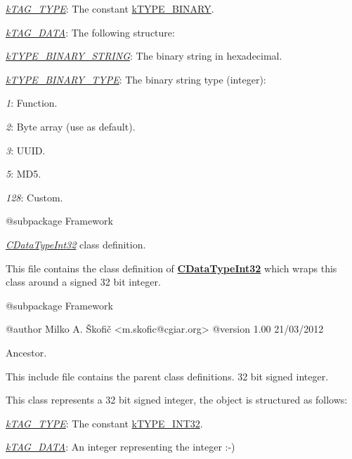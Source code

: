 \begin{DoxyItemize}
\item {\itshape \hyperlink{}{k\-T\-A\-G\-\_\-\-T\-Y\-P\-E}}\-: The constant \hyperlink{}{k\-T\-Y\-P\-E\-\_\-\-B\-I\-N\-A\-R\-Y}. 
\item {\itshape \hyperlink{}{k\-T\-A\-G\-\_\-\-D\-A\-T\-A}}\-: The following structure\-: 
\begin{DoxyItemize}
\item {\itshape \hyperlink{}{k\-T\-Y\-P\-E\-\_\-\-B\-I\-N\-A\-R\-Y\-\_\-\-S\-T\-R\-I\-N\-G}}\-: The binary string in hexadecimal. 
\item {\itshape \hyperlink{}{k\-T\-Y\-P\-E\-\_\-\-B\-I\-N\-A\-R\-Y\-\_\-\-T\-Y\-P\-E}}\-: The binary string type (integer)\-: 
\begin{DoxyItemize}
\item {\itshape 1}\-: Function. 
\item {\itshape 2}\-: Byte array (use as default). 
\item {\itshape 3}\-: U\-U\-I\-D. 
\item {\itshape 5}\-: M\-D5. 
\item {\itshape 128}\-: Custom. 
\end{DoxyItemize}
\end{DoxyItemize}
\end{DoxyItemize}

\begin{DoxyVerb} @subpackage        Framework\end{DoxyVerb}


{\itshape \hyperlink{class_c_data_type_int32}{C\-Data\-Type\-Int32}} class definition.

This file contains the class definition of {\bfseries \hyperlink{class_c_data_type_int32}{C\-Data\-Type\-Int32}} which wraps this class around a signed 32 bit integer.

\begin{DoxyVerb} @subpackage        Framework

 @author            Milko A. Škofič <m.skofic@cgiar.org>
 @version   1.00 21/03/2012\end{DoxyVerb}


Ancestor.

This include file contains the parent class definitions. 32 bit signed integer.

This class represents a 32 bit signed integer, the object is structured as follows\-:


\begin{DoxyItemize}
\item {\itshape \hyperlink{}{k\-T\-A\-G\-\_\-\-T\-Y\-P\-E}}\-: The constant \hyperlink{}{k\-T\-Y\-P\-E\-\_\-\-I\-N\-T32}. 
\item {\itshape \hyperlink{}{k\-T\-A\-G\-\_\-\-D\-A\-T\-A}}\-: An integer representing the integer \-:-\/) 
\end{DoxyItemize}

